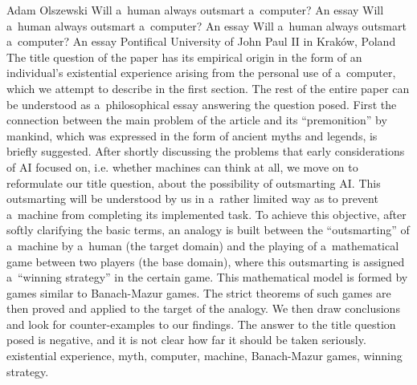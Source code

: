 \begin{artengenv}{Adam Olszewski}
	{Will a~human always outsmart a~computer? An essay}
	{Will a~human always outsmart a~computer? An essay}
	{Will a~human always outsmart a~computer? An essay}
	{Pontifical University of John Paul II in Kraków, Poland}
	{The title question of the paper has its empirical origin in the form of an individual's existential experience arising from the personal use of a~computer, which we attempt to describe in the first section. The rest of the entire paper can be understood as a~philosophical essay answering the question posed. First the connection between the main problem of the article and its ``premonition'' by mankind, which was expressed in the form of ancient myths and legends, is briefly suggested. After shortly discussing the problems that early considerations of AI focused on, i.e. whether machines can think at all, we move on to reformulate our title question, about the possibility of outsmarting AI. This outsmarting will be understood by us in a~rather limited way as to prevent a~machine from completing its implemented task. To achieve this objective, after softly clarifying the basic terms, an analogy is built between the ``outsmarting'' of a~machine by a~human (the target domain) and the playing of a~mathematical game between two players (the base domain), where this outsmarting is assigned a~``winning strategy'' in the certain game. This mathematical model is formed by games similar to Banach-Mazur games. The strict theorems of such games are then proved and applied to the target of the analogy. We then draw conclusions and look for counter-examples to our findings. The answer to the title question posed is negative, and it is not clear how far it should be taken seriously.
	}
	{existential experience, myth, computer, machine, Banach-Mazur games, winning strategy.}
	
	\setcounter{section}{-1}
	

\end{artengenv}
